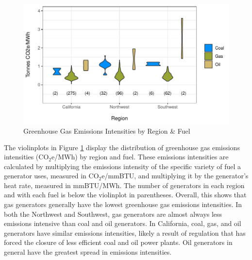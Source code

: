 \begin{figure}
    \centering
    \caption{Greenhouse Gas Emissions Intensities by Region \& Fuel \label{ghg_intensity}} 
    \includegraphics[width=\textwidth]{figures/chapter5_figures/EI_region_violin.pdf}
\end{figure}

The violinplots in Figure \ref{ghg_intensity} display the distribution of greenhouse gas emissions intensities (CO$_2$e/MWh) by region and fuel. These emissions intensities are calculated by multiplying the emissions intensity of the specific variety of fuel a generator uses, measured in CO$_2$e/mmBTU, and multiplying it by the generator's heat rate, measured in mmBTU/MWh. The number of generators in each region and with each fuel is below the violinplot in parentheses. Overall, this shows that gas generators generally have the lowest greenhouse gas emissions intensities. In both the Northwest and Southwest, gas generators are almost always less emissions intensive than coal and oil generators. In California, coal, gas, and oil generators have similar emissions intensities, likely a result of regulation that has forced the closure of less efficient coal and oil power plants. Oil generators in general have the greatest spread in emissions intensities. 

